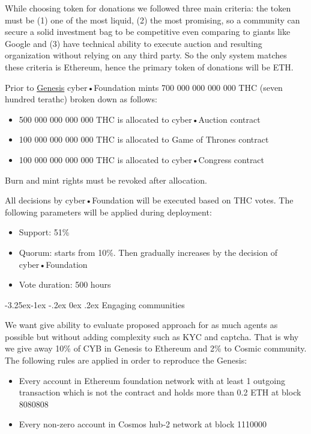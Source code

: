 \documentclass[8pt,oneside]{amsart}
\makeatletter
\renewcommand\subsection{\@startsection{subsection}{2}{\z@}%
                                     {-3.25ex\@plus -1ex \@minus -.2ex}%
                                     {0ex \@plus .2ex}%
                                     {\play\Large}}%
\newcommand{\titleSection}[1]{\subsection{#1}}
\newenvironment{Figure}
  {\par\medskip\noindent\minipage{\linewidth}}
  {\endminipage\par\medskip}
\makeatother
\begin{document}
While choosing token for donations we followed three main criteria: the token must be (1) one of the most liquid, (2) the most promising, so a community can secure a solid investment bag to be competitive even comparing to giants like Google and (3) have technical ability to execute auction and resulting organization without relying on any third party. So the only system matches these criteria is Ethereum, hence the primary token of donations will be ETH.

Prior to \hyperlink{genesis}{Genesis} cyber•Foundation mints 700 000 000 000 000 THC (seven hundred terathc) broken down as follows:

\begin{itemize}
\item 500 000 000 000 000 THC is allocated to cyber•Auction contract
\item 100 000 000 000 000 THC is allocated to Game of Thrones contract
\item 100 000 000 000 000 THC is allocated to cyber•Congress contract
\end{itemize}

\begin{Figure}
 \centering
 
\end{Figure}

Burn and mint rights must be revoked after allocation.

All decisions by cyber•Foundation will be executed based on THC votes. The following parameters will be applied during deployment:

\begin{itemize}
\item Support: 51\%
\item Quorum: starts from 10\%. Then gradually increases by the decision of cyber•Foundation
\item Vote duration: 500 hours
\end{itemize}

\titleSection{Engaging communities}\label{welcome}

We want give ability to evaluate proposed approach for as much agents as possible but without adding complexity such as KYC and captcha. That is why we give away 10\% of CYB in Genesis to Ethereum and 2\% to Cosmic community. The following rules are applied in order to reproduce the Genesis:
\begin{itemize}
\item Every account in Ethereum foundation network with at least 1 outgoing transaction which is not the contract and holds more than 0.2 ETH at block 8080808
\item Every non-zero account in Cosmos hub-2 network at block 1110000
\end{itemize}
\end{document}
